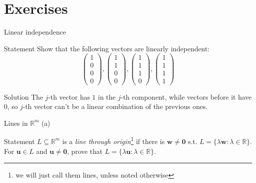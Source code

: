 \documentclass[10pt]{beamer}
\begin{document}
\section{Exercises}

\begin{frame}{Linear independence}
    \begin{block}{Statement}
        Show that the following vectors are linearly independent:
        $$
        \begin{pmatrix}1 \\ 0 \\ 0 \\ 0\end{pmatrix},
        \begin{pmatrix}1 \\ 1 \\ 0 \\ 0\end{pmatrix},
        \begin{pmatrix}1 \\ 1 \\ 1 \\ 0\end{pmatrix},
        \begin{pmatrix}1 \\ 1 \\ 1 \\ 1\end{pmatrix}
        $$
    \end{block}
\end{frame}

\begin{frame}{Solution}
    The $j$-th vector has $1$ in the $j$-th component, while vectors before it have $0$, so $j$-th vector can't be a linear combination of the previous ones.
\end{frame}

\begin{frame}{Lines in $\mathbb R^m$ (a)}
    \begin{block}{Statement}
        $L \subseteq \mathbb R^m$ is a \textit{line through origin}\footnote{we will just call them lines, unless noted otherwise} if there is $\mathbf w \neq \mathbf 0$ s.t. $L = \{\lambda \mathbf w : \lambda \in \mathbb R\}$. For $\mathbf u \in L$ and $\mathbf u \neq \mathbf 0$, prove that $L = \{\lambda \mathbf u : \lambda \in \mathbb R\}$.
    \end{block}
\end{frame}
\end{document}
